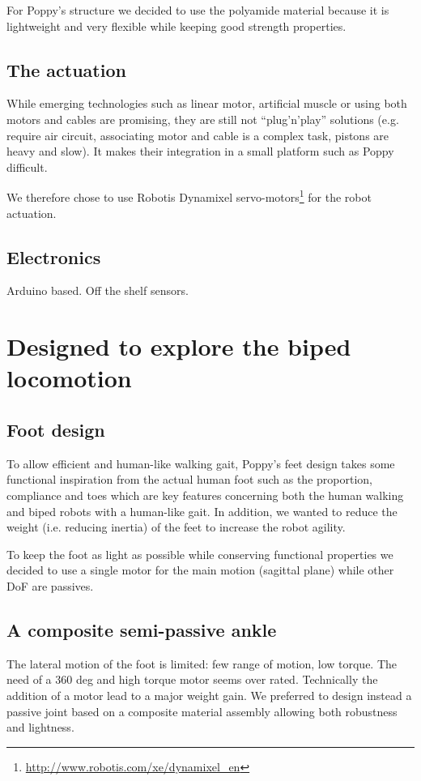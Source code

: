 For Poppy's structure we decided to use the polyamide material because it is lightweight and very flexible while keeping good strength properties.

\subsection{The actuation} %

While emerging technologies such as linear motor, artificial muscle or using both motors and cables are promising, they are still not ``plug'n'play'' solutions (e.g. require air circuit, associating motor and cable is a complex task, pistons are heavy and slow). It makes their integration in a small platform such as Poppy difficult.

We therefore chose to use Robotis Dynamixel servo-motors\footnote{\url{http://www.robotis.com/xe/dynamixel_en}} for the robot actuation. 


\subsection{Electronics} %
Arduino based. Off the shelf sensors.






\section{Designed to explore the biped locomotion}

\subsection{Foot design} %
To allow efficient and human-like walking gait, Poppy's feet design takes some functional inspiration from the actual human foot such as the proportion, compliance and toes which are key features concerning both the human walking and biped robots with a human-like gait. In addition, we wanted to reduce the weight (i.e. reducing inertia) of the feet to increase the robot agility.

To keep the foot as light as possible while conserving functional properties we decided to use a single motor for the main motion (sagittal plane) while other DoF are passives.

\subsection{A composite semi-passive ankle} %
The lateral motion of the foot is limited: few range of motion, low torque. The need of a 360 deg and high torque motor seems over rated. Technically the addition of a motor lead to a major weight gain. We preferred to design  instead a passive joint based on a composite material assembly allowing both robustness and lightness.


